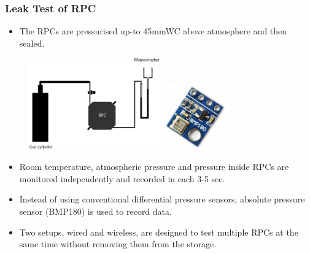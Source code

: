 \documentclass{beamer}
\begin{document}
\begin{frame}
  \frametitle{Leak Test of RPC}
  \vspace{-10pt}
  \begin{itemize} \itemsep -1pt
  \item The RPCs are pressurised up-to 45mmWC above atmosphere and
    then sealed.
  \end{itemize}
  \vspace{-8pt}
  \begin{figure}[h]%
    \centering
    \includegraphics[width=0.5\textwidth]{test_rpc.png}
    \hspace{20pt}
    \includegraphics[width=0.25\textwidth]{bmp-180.png}
  \end{figure}
  \vspace{-12pt}
  \begin{itemize} \itemsep -1pt
  \item Room temperature, atmospheric pressure and pressure inside
    RPCs are monitored independently and recorded in each 3-5 sec.
  \item Instead of using conventional differential pressure sensors,
    absolute pressure sensor (BMP180) is used to record data.
  \item Two setups, wired and wireless, are designed to test
    multiple RPCs at the same time without removing them from the
    storage.
  \end{itemize}
\end{frame}
\end{document}
